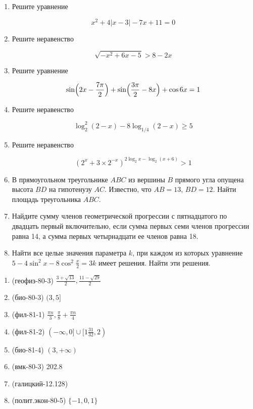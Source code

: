 \documentclass[11pt,a5paper]{report}
\begin{document}
\begin{enumerate}

\item Решите уравнение

$$x^2+4|x-3|-7x+11=0$$

\item Решите неравенство

$$\sqrt{-x^2+6x-5} > 8-2x$$

\item Решите уравнение

$$\sin \Bigl(2x-\frac{7\pi}{2}\Bigr)+\sin \Bigl(\frac{3\pi}{2}-8x\Bigr)+\cos 6x=1$$

\item Решите неравенство

$$\log_2^2(2-x)-8\log_{1/4}(2-x)\geqslant 5$$

\item Решите неравенство

$$(2^x+3\times 2^{-x})^{2\log_2 x - \log_2 (x+6)} > 1$$

\item В прямоугольном треугольнике $ABC$ из вершины $B$ прямого угла опущена высота $BD$ на гипотенузу $AC$. Известно, что $AB=13$, $BD=12$. Найти площадь треугольника $ABC$.

\item Найдите сумму членов геометрической прогрессии с пятнадцатого по двадцать первый включительно, если сумма первых семи членов прогрессии равна 14, а сумма первых четырнадцати ее членов равна 18.

\item Найти все целые значения параметра $k$, при каждом из которых уравнение $5-4\sin^2 x-8\cos^2\frac{x}{2}=3k$ имеет решения. Найти эти решения.
\end{enumerate}

\newpage

\begin{enumerate}
\item (геофиз-80-3) $\frac{3+\sqrt{13}}{2}, \frac{11-\sqrt{29}}{2}$

\item (био-80-3) $(3, 5]$

\item (фил-81-1) $\frac{\pi n}{3}, \frac{\pi}{8}+\frac{\pi n}{4}$

\item (фил-81-2) $(-\infty, 0] \cup [1\frac{31}{32}, 2)$

\item (био-81-4) $(3, +\infty)$

\item (вмк-80-3) 202.8

\item (галицкий-12.128)

\item (полит.экон-80-5) $\{-1,0,1\}$
\end{enumerate}
\end{document}
